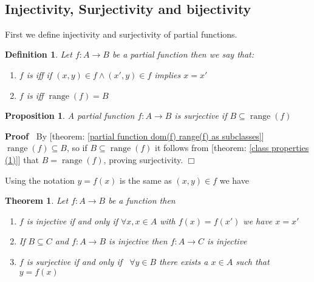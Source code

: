 \documentclass{book}
\newcommand{\tmop}[1]{\ensuremath{\operatorname{#1}}}
\newcommand{\tmtextbf}[1]{\text{{\bfseries{#1}}}}
\newenvironment{proof}{\noindent\textbf{Proof\ }}{\hspace*{\fill}$\Box$\medskip}
\newtheorem{definition}{Definition}
{\theorembodyfont{\rmfamily}\newtheorem{example}{Example}}
\newtheorem{proposition}{Proposition}
{\theorembodyfont{\rmfamily}\newtheorem{remark}{Remark}}
\newtheorem{theorem}{Theorem}
\begin{document}
\

\subsection{Injectivity, Surjectivity and bijectivity}

First we define injectivity and surjectivity of partial functions.

\begin{definition}
  \label{partial function injectivity and surjectivity}Let $f : A \rightarrow
  B$ be a partial function then we say that:
  \begin{enumerate}
    \item $f$ is \tmtextbf{injective} iff if $(x, y) \in f \wedge (x', y) \in
    f$ implies $x = x'$
    
    \item $f$ is \tmtextbf{surjective} iff $\tmop{range} (f) = B$
  \end{enumerate}
\end{definition}

\begin{proposition}
  \label{function surjection condition}A partial function $f : A \rightarrow
  B$ is surjective if $B \subseteq \tmop{range} (f)$
\end{proposition}

\begin{proof}
  By [theorem: \ref{partial function dom(f) range(f) as subclasses}]
  $\tmop{range} (f) \subseteq B$, so if $B \subseteq \tmop{range} (f)$ it
  follows from [theorem: \ref{class properties (1)}] that $B = \tmop{range}
  (f)$, proving surjectivity.
\end{proof}

Using the notation $y = f (x)$ is the same as $(x, y) \in f$ we have

\begin{theorem}
  \label{function injectivity, surjectivity}Let $f : A \rightarrow B$ be a
  function then
  \begin{enumerate}
    \item $f$ is injective if and only if $\forall x, x \in A$ with $f (x) = f
    (x')$ we have $x = x'$
    
    \item If $B \subseteq C$ and $f : A \rightarrow B$ is injective then $f :
    A \rightarrow C$ is injective
    
    \item $f$ is surjective if and only if \ $\forall y \in B$ there exists a
    $x \in A$ such that $y = f (x)$
  \end{enumerate}
\end{theorem}
\end{document}
